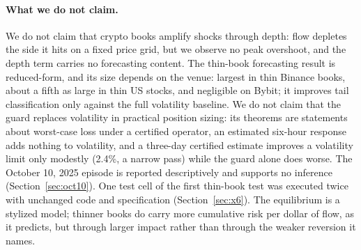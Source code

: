 \documentclass[12pt]{article}
\theoremstyle{definition}
\theoremstyle{remark}
\begin{document}
\paragraph{What we do not claim.} We do not claim that crypto books amplify shocks through depth: flow depletes the side it hits on a fixed price grid, but we observe no peak overshoot, and the depth term carries no forecasting content. The thin-book forecasting result is reduced-form, and its size depends on the venue: largest in thin Binance books, about a fifth as large in thin US stocks, and negligible on Bybit; it improves tail classification only against the full volatility baseline. We do not claim that the guard replaces volatility in practical position sizing: its theorems are statements about worst-case loss under a certified operator, an estimated six-hour response adds nothing to volatility, and a three-day certified estimate improves a volatility limit only modestly (2.4\%, a narrow pass) while the guard alone does worse. The October 10, 2025 episode is reported descriptively and supports no inference (Section~\ref{sec:oct10}). One test cell of the first thin-book test was executed twice with unchanged code and specification (Section~\ref{sec:x6}). The equilibrium is a stylized model; thinner books do carry more cumulative risk per dollar of flow, as it predicts, but through larger impact rather than through the weaker reversion it names.
\end{document}
